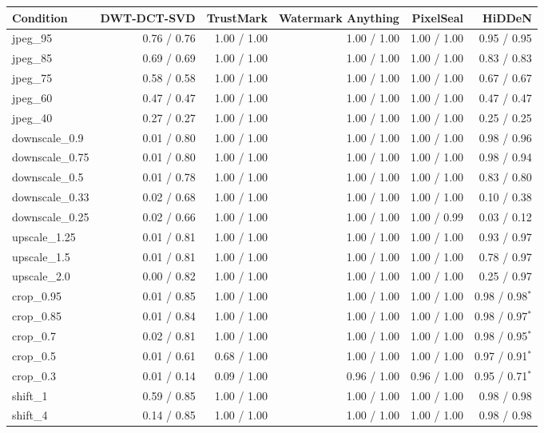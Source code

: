 \begin{tabular}{lrrrrr}
\toprule
Condition & DWT-DCT-SVD & TrustMark & Watermark Anything & PixelSeal & HiDDeN \\
\midrule
jpeg\_95 & 0.76 / 0.76 & 1.00 / 1.00 & 1.00 / 1.00 & 1.00 / 1.00 & 0.95 / 0.95 \\
jpeg\_85 & 0.69 / 0.69 & 1.00 / 1.00 & 1.00 / 1.00 & 1.00 / 1.00 & 0.83 / 0.83 \\
jpeg\_75 & 0.58 / 0.58 & 1.00 / 1.00 & 1.00 / 1.00 & 1.00 / 1.00 & 0.67 / 0.67 \\
jpeg\_60 & 0.47 / 0.47 & 1.00 / 1.00 & 1.00 / 1.00 & 1.00 / 1.00 & 0.47 / 0.47 \\
jpeg\_40 & 0.27 / 0.27 & 1.00 / 1.00 & 1.00 / 1.00 & 1.00 / 1.00 & 0.25 / 0.25 \\
downscale\_0.9 & 0.01 / 0.80 & 1.00 / 1.00 & 1.00 / 1.00 & 1.00 / 1.00 & 0.98 / 0.96 \\
downscale\_0.75 & 0.01 / 0.80 & 1.00 / 1.00 & 1.00 / 1.00 & 1.00 / 1.00 & 0.98 / 0.94 \\
downscale\_0.5 & 0.01 / 0.78 & 1.00 / 1.00 & 1.00 / 1.00 & 1.00 / 1.00 & 0.83 / 0.80 \\
downscale\_0.33 & 0.02 / 0.68 & 1.00 / 1.00 & 1.00 / 1.00 & 1.00 / 1.00 & 0.10 / 0.38 \\
downscale\_0.25 & 0.02 / 0.66 & 1.00 / 1.00 & 1.00 / 1.00 & 1.00 / 0.99 & 0.03 / 0.12 \\
upscale\_1.25 & 0.01 / 0.81 & 1.00 / 1.00 & 1.00 / 1.00 & 1.00 / 1.00 & 0.93 / 0.97 \\
upscale\_1.5 & 0.01 / 0.81 & 1.00 / 1.00 & 1.00 / 1.00 & 1.00 / 1.00 & 0.78 / 0.97 \\
upscale\_2.0 & 0.00 / 0.82 & 1.00 / 1.00 & 1.00 / 1.00 & 1.00 / 1.00 & 0.25 / 0.97 \\
crop\_0.95 & 0.01 / 0.85 & 1.00 / 1.00 & 1.00 / 1.00 & 1.00 / 1.00 & 0.98 / 0.98$^*$ \\
crop\_0.85 & 0.01 / 0.84 & 1.00 / 1.00 & 1.00 / 1.00 & 1.00 / 1.00 & 0.98 / 0.97$^*$ \\
crop\_0.7 & 0.02 / 0.81 & 1.00 / 1.00 & 1.00 / 1.00 & 1.00 / 1.00 & 0.98 / 0.95$^*$ \\
crop\_0.5 & 0.01 / 0.61 & 0.68 / 1.00 & 1.00 / 1.00 & 1.00 / 1.00 & 0.97 / 0.91$^*$ \\
crop\_0.3 & 0.01 / 0.14 & 0.09 / 1.00 & 0.96 / 1.00 & 0.96 / 1.00 & 0.95 / 0.71$^*$ \\
shift\_1 & 0.59 / 0.85 & 1.00 / 1.00 & 1.00 / 1.00 & 1.00 / 1.00 & 0.98 / 0.98 \\
shift\_4 & 0.14 / 0.85 & 1.00 / 1.00 & 1.00 / 1.00 & 1.00 / 1.00 & 0.98 / 0.98 \\

\end{tabular}
